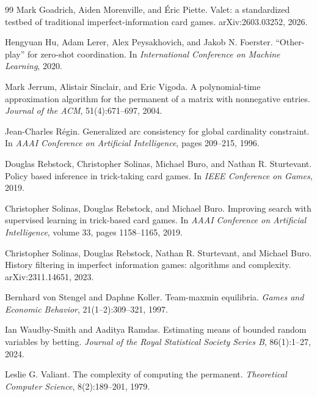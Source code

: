 \documentclass[11pt,a4paper]{article}
\begin{document}
\begin{thebibliography}{99}
Mark Goadrich, Aiden Morenville, and \'Eric Piette.
\newblock Valet: a standardized testbed of traditional imperfect-information
card games.
\newblock arXiv:2603.03252, 2026.

Hengyuan Hu, Adam Lerer, Alex Peysakhovich, and Jakob N. Foerster.
\newblock ``Other-play'' for zero-shot coordination.
\newblock In \emph{International Conference on Machine Learning}, 2020.

Mark Jerrum, Alistair Sinclair, and Eric Vigoda.
\newblock A polynomial-time approximation algorithm for the permanent of a
matrix with nonnegative entries.
\newblock \emph{Journal of the ACM}, 51(4):671--697, 2004.

Jean-Charles R\'egin.
\newblock Generalized arc consistency for global cardinality constraint.
\newblock In \emph{AAAI Conference on Artificial Intelligence}, pages
209--215, 1996.

Douglas Rebstock, Christopher Solinas, Michael Buro, and Nathan R. Sturtevant.
\newblock Policy based inference in trick-taking card games.
\newblock In \emph{IEEE Conference on Games}, 2019.

Christopher Solinas, Douglas Rebstock, and Michael Buro.
\newblock Improving search with supervised learning in trick-based card games.
\newblock In \emph{AAAI Conference on Artificial Intelligence}, volume 33,
pages 1158--1165, 2019.

Christopher Solinas, Douglas Rebstock, Nathan R. Sturtevant, and Michael Buro.
\newblock History filtering in imperfect information games: algorithms and
complexity.
\newblock arXiv:2311.14651, 2023.

Bernhard von Stengel and Daphne Koller.
\newblock Team-maxmin equilibria.
\newblock \emph{Games and Economic Behavior}, 21(1--2):309--321, 1997.

Ian Waudby-Smith and Aaditya Ramdas.
\newblock Estimating means of bounded random variables by betting.
\newblock \emph{Journal of the Royal Statistical Society Series B},
86(1):1--27, 2024.

Leslie G. Valiant.
\newblock The complexity of computing the permanent.
\newblock \emph{Theoretical Computer Science}, 8(2):189--201, 1979.

\end{thebibliography}
\end{document}
